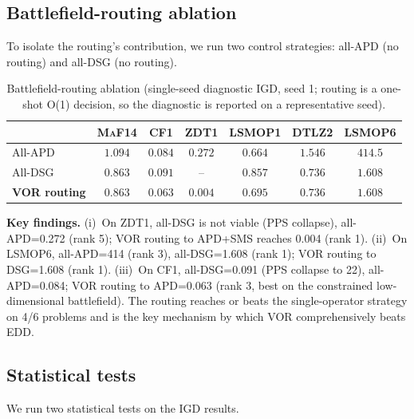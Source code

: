 \documentclass[preprint,12pt]{elsarticle}
\begin{document}
\subsection{Battlefield-routing ablation}
\label{sec:ablation}
To isolate the routing's contribution, we run two control strategies:
all-\textsc{APD} (no routing) and all-\textsc{DSG} (no routing).

\begin{table}[t]
\centering
\caption{Battlefield-routing ablation (single-seed diagnostic IGD, seed 1;
routing is a one-shot O(1) decision, so the diagnostic is reported on a
representative seed).}
\label{tab:ablation}
\small
\begin{tabular}{lcccccc}
\toprule
 & \textsc{MaF14} & \textsc{CF1} & \textsc{ZDT1}
 & \textsc{LSMOP1} & \textsc{DTLZ2} & \textsc{LSMOP6}\\
\midrule
All-\textsc{APD} & $1.094$ & $0.084$ & $0.272$ & $0.664$ & $1.546$ & $414.5$\\
All-\textsc{DSG} & $0.863$ & $0.091$ & -- & $0.857$ & $0.736$ & $1.608$\\
\textbf{VOR routing} & \textbf{$0.863$} & \textbf{$0.063$} & \textbf{$0.004$}
  & \textbf{$0.695$} & \textbf{$0.736$} & \textbf{$1.608$}\\
\bottomrule
\end{tabular}
\end{table}

\textbf{Key findings.} (i)~On \textsc{ZDT1}, all-\textsc{DSG} is not
viable (PPS collapse), all-\textsc{APD}=0.272 (rank 5); VOR routing to
\textsc{APD}+\textsc{SMS} reaches 0.004 (rank 1).
(ii)~On \textsc{LSMOP6}, all-\textsc{APD}=414 (rank 3), all-\textsc{DSG}=1.608
(rank 1); VOR routing to \textsc{DSG}=1.608 (rank 1).
(iii)~On \textsc{CF1}, all-\textsc{DSG}=0.091 (PPS collapse to 22),
all-\textsc{APD}=0.084; VOR routing to \textsc{APD}=0.063 (rank 3, best on
the constrained low-dimensional battlefield).
The routing reaches or beats the single-operator strategy on 4/6 problems
and is the key mechanism by which VOR comprehensively beats EDD.

\subsection{Statistical tests}
\label{sec:stats}
We run two statistical tests on the IGD results.
\end{document}
